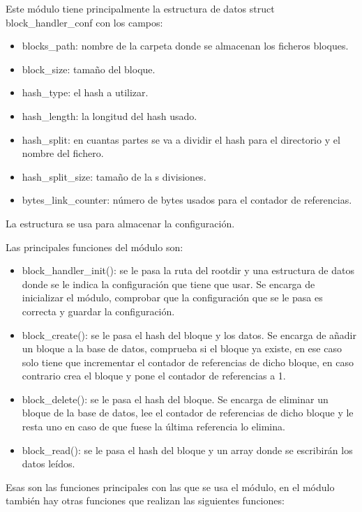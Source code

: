 \documentclass[a4paper,12pt]{article}
\begin{document}
Este módulo tiene principalmente la estructura de datos struct block\_handler\_conf con los campos:

\begin{itemize}
\item blocks\_path: nombre de la carpeta donde se almacenan los ficheros bloques.
\item block\_size: tamaño del bloque.
\item hash\_type: el hash a utilizar.
\item hash\_length: la longitud del hash usado.
\item hash\_split: en cuantas partes se va a dividir el hash para el directorio y el nombre del fichero.
\item hash\_split\_size: tamaño de la s divisiones.
\item bytes\_link\_counter: número de bytes usados para el contador de referencias.
\end{itemize}

La estructura se usa para almacenar la configuración.
\bigskip

Las principales funciones del módulo son:
\begin{itemize}
\item block\_handler\_init(): se le pasa la ruta del rootdir y una estructura de datos donde se le indica la configuración que tiene que usar. Se encarga de inicializar el módulo, comprobar que la configuración que se le pasa es correcta y guardar la configuración.

\item block\_create(): se le pasa el hash del bloque y los datos. Se encarga de añadir un bloque a la base de datos, comprueba si el bloque ya existe, en ese caso solo tiene que incrementar el contador de referencias de dicho bloque, en caso contrario crea el bloque y pone el contador de referencias a 1.

\item block\_delete(): se le pasa el hash del bloque. Se encarga de eliminar un bloque de la base de datos, lee el contador de referencias de dicho bloque y le resta uno en caso de que fuese la última referencia lo elimina.

\item block\_read(): se le pasa el hash del bloque y un array donde se escribirán los datos leídos.
\end{itemize}

Esas son las funciones principales con las que se usa el módulo, en el módulo también hay otras funciones que realizan las siguientes funciones:
\end{document}

